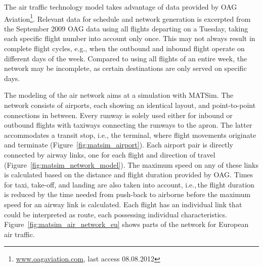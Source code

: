 The air traffic technology model takes advantage of data provided by OAG Aviation\footnote{\url{www.oagaviation.com}, last access 08.08.2012}. 
Relevant data for schedule and network generation is excerpted from the September 2009 OAG data using all flights departing on a Tuesday, taking each specific flight number into account only once.
This may not always result in complete flight cycles, e.g., when the outbound and inbound flight operate on different days of the week. 
Compared to using all flights of an entire week, the network may be incomplete, as certain destinations are only served on specific days.


The modeling of the air network aims at a simulation with MATSim.  
The network consists of airports, each showing an identical layout, and point-to-point connections in between. 
Every runway is solely used either for inbound or outbound flights with taxiways connecting the runways to the apron. The latter accommodates a transit stop, i.e., the terminal, where flight movements originate and terminate (Figure~\ref{fig:matsim_airport}). 
Each airport pair is directly connected by airway links, one for each flight and direction of travel (Figure~\ref{fig:matsim_network_model}). 
The maximum speed on any of these links is calculated based on the distance and flight duration provided by OAG. 
Times for taxi, take-off, and landing are also taken into account, i.e.,\,the flight duration is reduced by the time needed from push-back to airborne before the maximum speed for an airway link is calculated.
Each flight has an individual link that could be interpreted as route, each possessing individual characteristics. 
Figure~\ref{fig:matsim_air_network_eu} shows parts of the network for European air traffic.

